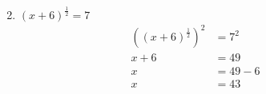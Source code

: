 \documentclass{article}
\begin{document}
\begin{description}
\begin{enumerate}
\begin{equation}
\begin{split}
                      \end{split}
                  \end{equation}
            \item $(x+6)^\frac{1}{2} = 7$
                  \begin{equation}
                      \begin{split}
                          ((x+6)^\frac{1}{2})^2 & = 7^2 \\
                          x + 6 & = 49 \\
                          x & = 49 - 6 \\
                          x & = 43 \\
                      \end{split}
                  \end{equation}
        \end{enumerate}


\end{description}
\end{document}
